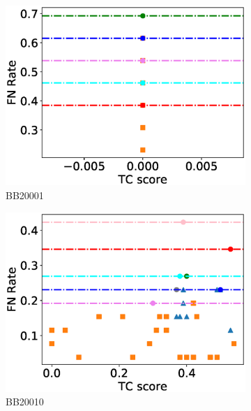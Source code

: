 \begin{figure}[!htbp]
	\centering
	\begin{adjustwidth}{-1cm}{-1cm}
		\begin{subfigure}{0.22\textwidth}
			\includegraphics[width=\columnwidth]{Figure/summary/precomputedInit/Balibase/BB20001_fnrate_vs_tc_2}
			\caption{BB20001}
		\end{subfigure}	
		\begin{subfigure}{0.22\textwidth}
			\includegraphics[width=\columnwidth]{Figure/summary/precomputedInit/Balibase/BB20010_fnrate_vs_tc_2}
			\caption{BB20010}
		\end{subfigure}
		\begin{subfigure}{0.22\textwidth}

\end{subfigure}
\end{adjustwidth}
\end{figure}
